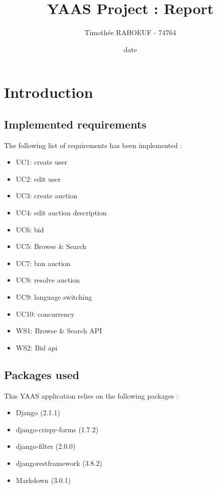 \documentclass[a4paper, 11pt]{report}
\title{YAAS Project : Report}
\author{Timothée RABOEUF - 74764}
\date{date}
\begin{document}
 
\maketitle
\tableofcontents
    
\chapter{Introduction}

    \section{Implemented requirements}

    The following list of requirements has been implemented : 
    \begin{itemize}
        \item UC1: create user
        \item UC2: edit user
        \item UC3: create auction
        \item UC4: edit auction description
        \item UC6: bid
        \item UC5: Browse \& Search
        \item UC7: ban auction
        \item UC8: resolve auction
        \item UC9: language switching
        \item UC10: concurrency
        \item WS1: Browse \& Search API
        \item WS2: Bid api

    \end{itemize}

    \section{Packages used}
    This YAAS application relies on the following packages :
    \begin{itemize}
        \item Django (2.1.1)
        \item django-crispy-forms (1.7.2)
        \item django-filter (2.0.0) 
        \item djangorestframework (3.8.2)
        \item Markdown (3.0.1)
        
    \end{itemize}
\end{document}
